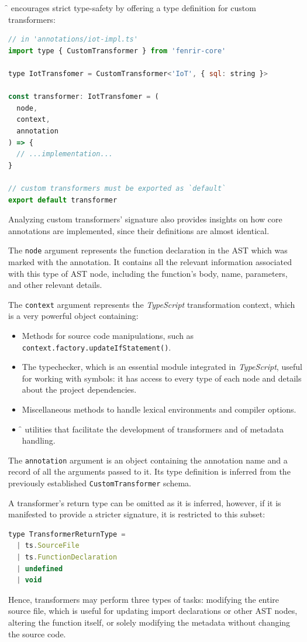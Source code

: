 \f{} encourages strict type-safety by offering a type definition for custom transformers:
\begin{lstlisting}[language=javascript, caption={Custom transformer for a new \annotation{$\dollar$IoT} annotation.}, label={lst:custom-transformer}]
// in 'annotations/iot-impl.ts'
import type { CustomTransformer } from 'fenrir-core'

type IotTransfomer = CustomTransformer<'IoT', { sql: string }>

const transformer: IotTransfomer = (
  node,
  context,
  annotation
) => {
  // ...implementation...
}

// custom transformers must be exported as `default`
export default transformer
\end{lstlisting}

Analyzing custom transformers' signature also provides insights on how
core annotations are implemented, since their definitions are almost identical.

The \verb|node| argument represents the function declaration in the AST which was marked with the annotation.
It contains all the relevant information associated with this type of AST node,
including the function's body, name, parameters, and other relevant details.

The \verb|context| argument represents the \textit{TypeScript} transformation context,
which is a very powerful object containing:
\begin{itemize}
  \item Methods for source code manipulations, such as\\\verb|context.factory.updateIfStatement()|.
  \item The typechecker, which is an essential module integrated in \textit{TypeScript}, useful for working with symbols:
    it has access to every type of each node and details about the project dependencies.
  \item Miscellaneous methods to handle lexical environments and compiler options.
  \item \f{} utilities that facilitate the development of transformers and of metadata handling.
\end{itemize}

The \verb|annotation| argument is an object containing the annotation name
and a record of all the arguments passed to it.
Its type definition is inferred from the previously established \verb|CustomTransformer| schema.

A transformer's return type can be omitted as it is inferred, however,
if it is manifested to provide a stricter signature, it is restricted to this subset:
\begin{lstlisting}[language=javascript, numbers=none]
type TransformerReturnType =
  | ts.SourceFile
  | ts.FunctionDeclaration
  | undefined
  | void
\end{lstlisting}
Hence, transformers may perform three types of tasks:
modifying the entire source file, which is useful for updating import declarations or other AST nodes,
altering the function itself,
or solely modifying the metadata without changing the source code.

